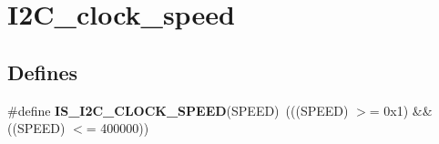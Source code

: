 \hypertarget{group__I2C__clock__speed}{
\section{I2C\_\-clock\_\-speed}
\label{group__I2C__clock__speed}
}
\subsection*{Defines}
\begin{DoxyCompactItemize}
\item 
\hypertarget{group__I2C__clock__speed_gae0d731df1b264d853703716c29309b9b}{
\#define {\bfseries IS\_\-I2C\_\-CLOCK\_\-SPEED}(SPEED)~(((SPEED) $>$= 0x1) \&\& ((SPEED) $<$= 400000))}
\label{group__I2C__clock__speed_gae0d731df1b264d853703716c29309b9b}

\end{DoxyCompactItemize}
